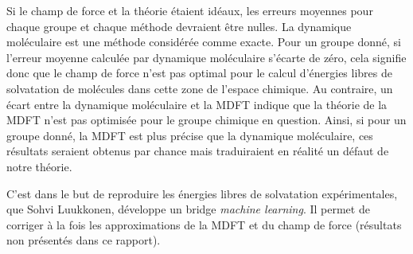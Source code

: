 Si le champ de force et la théorie étaient idéaux, les erreurs moyennes pour chaque groupe et chaque méthode devraient être nulles. La dynamique moléculaire est une méthode considérée comme exacte. Pour un groupe donné, si l'erreur moyenne calculée par dynamique moléculaire s'écarte de zéro, cela signifie donc que le champ de force n'est pas optimal pour le calcul d'énergies libres de solvatation de molécules dans cette zone de l'espace chimique. Au contraire, un écart entre la dynamique moléculaire et la MDFT indique que la théorie de la MDFT n'est pas optimisée pour le groupe chimique en question. Ainsi, si pour un groupe donné, la MDFT est plus précise que la dynamique moléculaire, ces résultats seraient obtenus par chance mais traduiraient en réalité un défaut de notre théorie. 

C'est dans le but de reproduire les énergies libres de solvatation expérimentales, que Sohvi Luukkonen, développe un bridge \textit{machine learning}. Il permet de corriger à la fois les approximations de la MDFT et du champ de force (résultats non présentés dans ce rapport).


